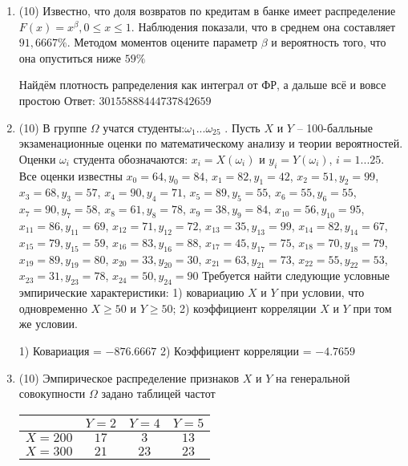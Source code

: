\documentclass[a4paper,12pt]{article}
\begin{document}
\begin{enumerate}
\item


(10) Известно, что доля возвратов по кредитам в банке имеет распределение $F(x) = x ^{\beta}, 0 \leqslant x \leqslant 1$.
Наблюдения показали, что в среднем она составляет $91,6667\%$. Методом моментов оцените параметр $\beta$ и
вероятность того, что она опуститься ниже $59\%$




Найдём плотность рапределения как интеграл от ФР, а дальше всё и вовсе простою Ответ: $30155888444737842659$


\item


(10) В группе $\Omega$ учатся студенты:$\omega _{1}...\omega _{25}$ . Пусть $X$ и $Y$ – 100-балльные экзаменационные оценки по
математическому анализу и теории вероятностей. Оценки $\omega _{i}$ студента обозначаются: $x _{i} = X(\omega _{i})$ и $y _{i} = Y(\omega _{i})$, $i = 1...25$. Все оценки известны
$x _{0} = 64, y _{0} = 84$, $x _{1} = 82, y _{1} = 42$, $x _{2} = 51, y _{2} = 99$, $x _{3} = 68, y _{3} = 57$, $x _{4} = 90, y _{4} = 71$, $x _{5} = 89, y _{5} = 55$, $x _{6} = 55, y _{6} = 55$, $x _{7} = 90, y _{7} = 58$, $x _{8} = 61, y _{8} = 78$, $x _{9} = 38, y _{9} = 84$, $x _{10} = 56, y _{10} = 95$, $x _{11} = 86, y _{11} = 69$, $x _{12} = 71, y _{12} = 72$, $x _{13} = 35, y _{13} = 99$, $x _{14} = 82, y _{14} = 67$, $x _{15} = 79, y _{15} = 59$, $x _{16} = 83, y _{16} = 88$, $x _{17} = 45, y _{17} = 75$, $x _{18} = 70, y _{18} = 79$, $x _{19} = 89, y _{19} = 80$, $x _{20} = 33, y _{20} = 30$, $x _{21} = 63, y _{21} = 73$, $x _{22} = 55, y _{22} = 53$, $x _{23} = 31, y _{23} = 78$, $x _{24} = 50, y _{24} = 90$
Требуется
найти следующие условные эмпирические характеристики: 1) ковариацию $X$ и $Y$ при условии, что одновременно $X \geqslant 50$
 и $Y \geqslant 50$; 2) коэффициент корреляции $X$ и $Y$ при том же условии.




1) Ковариация = $-876.6667$
2) Коэффициент корреляции = $-4.7659$


\item


(10) Эмпирическое распределение признаков $X$ и $Y$ на генеральной совокупности $\Omega$ задано таблицей частот  
 
\begin{tabular}{ | c | c | c | c | }
\hline
 & $Y = 2$ & $Y = 4$ & $Y = 5$  \\ \hline
$X = 200$ & $17$ & $3$ & $13$\\ \hline
$X = 300$ & $21$ & $23$ & $23$\\
\hline
\end{tabular}


\end{enumerate}
\end{document}
